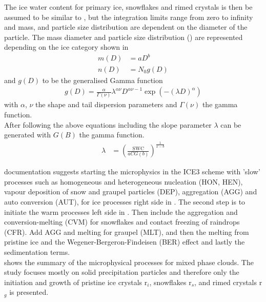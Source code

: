 The ice water content for primary ice, snowflakes and rimed crystals is then be assumed to be similar to , but the integration limits range from zero to infinity and mass, and particle size distribution are dependent on the diameter of the particle. The mass diameter and particle size distribution () are represented depending on the ice category shown in 
\begin{align}
	m(D) & = aD^b 	\label{eq:mass_diameter} \\
	n(D) & = N_0 g(D)	\label{eq:PSD_MEPS}
\end{align}
and $g(D)$ to be the generalised Gamma function 
\begin{align}
	g(D) = \frac{\alpha}{\Gamma(\nu)} \lambda^{\alpha \nu} D^{\alpha \nu -1} \exp\left( -(\lambda D)^\alpha \right)
\end{align}
with $\alpha$, $\nu$ the shape and tail dispersion parameters and $\Gamma(\nu)$ the gamma function. 
\\
After following the above equations including  the slope parameter $\lambda$ can be generated with $G(B)$ the gamma function.
\begin{align}
	\lambda & = \left( \frac{\text{SWC}}{aCG(b)}\right)^{\frac{1}{x-b}}
\end{align}
%

%

\newline
\cite{meteo_france_meso-nh_2009} documentation suggests starting the microphysics in the ICE3 scheme with 'slow' processes such as homogeneous and heterogeneous nucleation (HON, HEN), vapour deposition of snow and graupel particles (DEP), aggregation (AGG) and auto conversion (AUT), for ice processes right side in . The second step is to initiate the warm processes left side in . Then include the aggregation and conversion-melting (CVM) for snowflakes and contact freezing of raindrops (CFR). Add AGG and melting for graupel (MLT), and then the melting from pristine ice  and the Wegener-Bergeron-Findeisen (BER) effect and lastly the sedimentation terms.  \\
 shows the summary of the microphysical processes for mixed phase clouds. The study focuses mostly on solid precipitation particles and therefore only the initiation and growth of pristine ice crystals r$_i$, snowflakes r$_s$, and rimed crystals r$_g$ is presented. 
